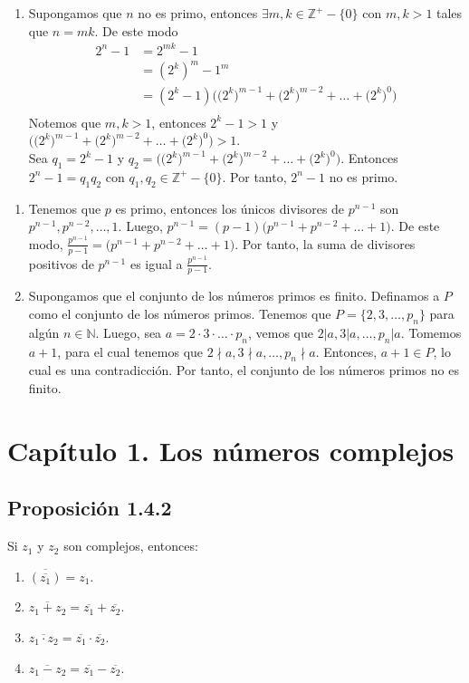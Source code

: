 \documentclass[11pt]{article}
\newcommand{\N}{\mathbb{N}}
\newcommand{\Z}{\mathbb{Z}}
\begin{document}
\begin{enumerate}[label=40]
  \item Supongamos que $n$ no es primo, entonces $\exists m,k \in \Z^+ -\{0 \}$ con $m,k>1$ tales que $n=mk$. De este modo
    \begin{align*}
      2^n-1 &= 2^{mk}-1\\
      &= (2^k)^m-1^m\\
      &= (2^k-1) \Big( \big(2^k \big)^{m-1}+\big(2^k\big)^{m-2}+ \dots +\big(2^k\big)^0 \Big)\\
    \end{align*}
  Notemos que $m,k>1$, entonces $2^k-1 > 1$ y $\Big( \big(2^k \big)^{m-1}+\big(2^k\big)^{m-2}+ \dots +\big(2^k\big)^0 \Big) > 1$.\\ Sea $q_1=2^k-1$ y $q_2=\Big( \big(2^k \big)^{m-1}+\big(2^k\big)^{m-2}+ \dots +\big(2^k\big)^0 \Big)$. Entonces $2^n-1=q_1q_2$ con $q_1,q_2\in \Z^+ -\{0 \}$. Por tanto, $2^n-1$ no es primo.
\end{enumerate}

\begin{enumerate}[start=43]
  \item Tenemos que $p$ es primo, entonces los únicos divisores de $p^{n-1}$ son $p^{n-1}, p^{n-2}, \dots, 1$. Luego, $p^{n-1}=(p-1)\big( p^{n-1}+p^{n-2}+\dots +1 \big)$. De este modo, $\frac{p^{n-1}}{p-1}=\big( p^{n-1}+p^{n-2}+\dots +1 \big)$. Por tanto, la suma de divisores positivos de $p^{n-1}$ es igual a $\frac{p^{n-1}}{p-1}$.
  \item Supongamos que el conjunto de los números primos es finito. Definamos a $P$ como el conjunto de los números primos. Tenemos que $P=\{2,3, \ldots, p_n \}$ para algún $n\in\N$. Luego, sea $a=2 \cdot 3 \cdot \ldots \cdot p_n$, vemos que $2|a, 3|a, \ldots , p_n|a$. Tomemos $a+1$, para el cual tenemos que $2 \nmid a, 3 \nmid a, \ldots , p_n \nmid a$. Entonces, $a+1\in P$, lo cual es una contradicción. Por tanto, el conjunto de los números primos no es finito.
\end{enumerate}



\section*{Capítulo 1. Los números complejos}


\subsection*{Proposición 1.4.2} Si $z_1$ y $z_2$ son complejos, entonces: \begin{enumerate}[label=\roman*)]
  \item $\overline{(\overline{z_1})}=z_1$.
  \item $\overline{z_1+z_2} = \overline{z_1}+\overline{z_2}$.
  \item $\overline{z_1\cdot z_2} = \overline{z_1} \cdot \overline{z_2}$.
  \item $\overline{z_1-z_2} = \overline{z_1} - \overline{z_2}$.
\end{enumerate}
\end{document}
